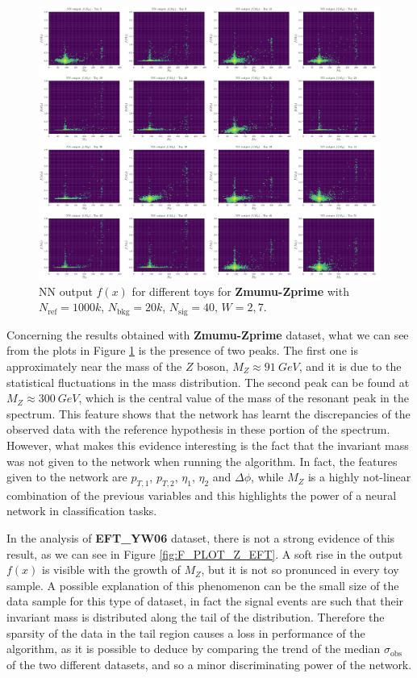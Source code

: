 \begin{figure}[H]
	\centering
	\includegraphics[width=1.0\textwidth]{Python/RESULTS/INV_MASS/f_plot_Zprime.pdf}
	\caption{NN output $f(x)$ for different toys for \textbf{Zmumu-Zprime} with $N_\mathrm{ref}=1000\si{k}$, $N_\mathrm{bkg}=20\si{k}$, $N_\mathrm{sig}=40$, $W=2,7$.}
	\label{fig:F_PLOT_Z_PRIME}
\end{figure}

Concerning the results obtained with \textbf{Zmumu-Zprime} dataset, what we can see from the plots in Figure \ref{fig:F_PLOT_Z_PRIME} is the presence of two peaks. The first one is approximately near the mass of the $Z$ boson, $M_{Z} \approx 91~\si{GeV}$, and it is due to the statistical fluctuations in the mass distribution. The second peak can be found at $M_{Z} \approx 300~\si{GeV}$, which is the central value of the mass of the resonant peak in the spectrum. This feature shows that the network has learnt the discrepancies of the observed data with the reference hypothesis in these portion of the spectrum. However, what makes this evidence interesting is the fact that the invariant mass was not given to the network when running the algorithm. In fact, the features given to the network are $p_{T,1}$, $p_{T,2}$, $\eta_{1}$, $\eta_{2}$ and $\Delta \phi$, while $M_{Z}$ is a highly not-linear combination of the previous variables and this highlights the power of a neural network in classification tasks.

In the analysis of \textbf{EFT\_YW06} dataset, there is not a strong evidence of this result, as we can see in Figure \ref{fig:F_PLOT_Z_EFT}. A soft rise in the output $f(x)$ is visible with the growth of $M_{Z}$, but it is not so pronunced in every toy sample. A possible explanation of this phenomenon can be the small size of the data sample for this type of dataset, in fact the signal events are such that their invariant mass is distributed along the tail of the distribution. Therefore the sparsity of the data in the tail region causes a loss in performance of the algorithm, as it is possible to deduce by comparing the trend of the median $\sigma_\mathrm{obs}$ of the two different datasets, and so a minor discriminating power of the network.

